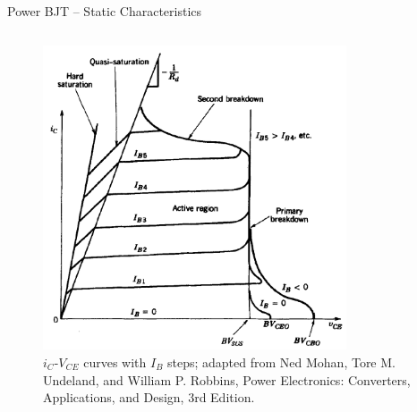 \begin{frame}{Power BJT – Static Characteristics}
\begin{columns}
    \begin{column}{0.4\textwidth}
    \begin{figure}
        \centering
        \includegraphics[width=0.8\textwidth]{fig/lec04/BJT_VI_Characteristics2.png}
        \caption{$i_C$-$V_{CE}$ curves with $I_B$ steps; adapted from Ned Mohan, Tore M. Undeland, and William P. Robbins, Power Electronics: Converters, Applications, and Design, 3rd Edition.}
    \end{figure}
    \end{column}
\end{columns}
\end{frame}

